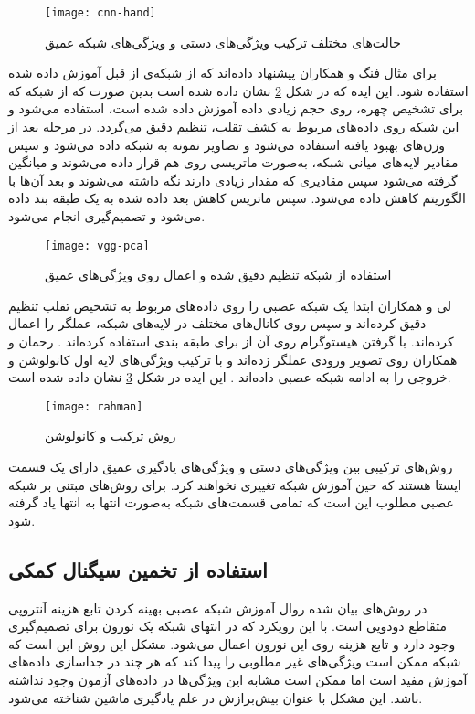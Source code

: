 \begin{figure}[hb]
	\centerline{\texttt{[image: cnn-hand]}}
	\caption{حالت‌های مختلف ترکیب ویژگی‌های دستی و ویژگی‌های شبکه عمیق \cite{yu2021deep}}
	\label{fig:cnn-hand}
\end{figure}

برای مثال فنگ و همکاران 
\cite{li2016original} 
پیشنهاد داده‌اند که از شبکه‌ی از قبل آموزش داده شده استفاده شود. 
این ایده که در شکل 
\ref{fig:vgg-pca}
 نشان داده شده است
بدین صورت که از شبکه
  \cite{parkhi2015deep}
 که برای تشخیص چهره، روی حجم زیادی داده آموزش داده شده است، استفاده می‌شود و این شبکه روی داده‌های مربوط به کشف تقلب، تنظیم دقیق
  می‌گردد. در مرحله بعد از وزن‌های بهبود یافته استفاده می‌شود و تصاویر نمونه به شبکه داده می‌شود و سپس مقادیر لایه‌های میانی شبکه، به‌صورت ماتریسی روی هم قرار داده می‌شوند و میانگین گرفته می‌شود سپس مقادیری که مقدار زیادی دارند نگه داشته می‌شوند و بعد آن‌ها با الگوریتم  کاهش داده می‌شود. سپس ماتریس کاهش بعد داده شده به یک طبقه بند  داده می‌شود و تصمیم‌گیری انجام می‌شود. 
\begin{figure}[h]
	\centerline{\texttt{[image: vgg-pca]}}
	\caption{استفاده از شبکه تنظیم دقیق شده و اعمال
		روی ویژگی‌های عمیق
		\cite{li2016original}}
	\label{fig:vgg-pca}
\end{figure}

لی و همکاران ابتدا یک شبکه عصبی
را روی داده‌های مربوط به تشخیص تقلب تنظیم دقیق کرده‌اند و سپس روی کانال‌های مختلف در لایه‌های شبکه، عملگر  را اعمال کرده‌اند. با گرفتن هیستوگرام روی آن از  برای طبقه بندی استفاده کرده‌اند
\cite{li2019face}.
رحمان و همکاران روی تصویر ورودی عملگر  زده‌اند و با ترکیب ویژگی‌های لایه اول کانولوشن و خروجی  را به ادامه شبکه عصبی داده‌اند
\cite{rehman2020enhancing}. 
 این ایده در شکل
\ref{fig:rahman}
نشان داده شده است.
\begin{figure}[!h]
	\centerline{\texttt{[image: rahman]}}
	\caption{روش ترکیب  و کانولوشن \cite{rehman2020enhancing}}
	\label{fig:rahman}
\end{figure}

روش‌های ترکیبی بین ویژگی‌های دستی و ویژگی‌های یادگیری عمیق دارای یک قسمت ایستا هستند که حین آموزش شبکه تغییری نخواهند کرد. برای روش‌های مبتنی بر شبکه عصبی مطلوب این است که تمامی قسمت‌های شبکه به‌صورت انتها به انتها یاد گرفته شود.


\subsection{استفاده از تخمین سیگنال کمکی}
در روش‌های بیان شده روال آموزش شبکه عصبی بهینه کردن تابع هزینه آنتروپی متقاطع دودویی
 است. با این رویکرد که در انتهای شبکه یک نورون برای تصمیم‌گیری وجود دارد و تابع هزینه روی این نورون اعمال می‌شود. مشکل این روش این است که شبکه ممکن است ویژگی‌های غیر مطلوبی را پیدا کند که هر چند در جداسازی داده‌های آموزش مفید است اما ممکن است مشابه این ویژگی‌ها در داده‌های آزمون وجود نداشته باشد. این مشکل با عنوان بیش‌برازش
  در علم یادگیری ماشین شناخته می‌شود.

